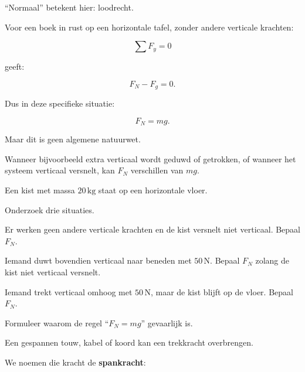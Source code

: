 \documentclass{ximera}
\begin{document}
``Normaal'' betekent hier: loodrecht.



Voor een boek in rust op een horizontale tafel, zonder andere verticale
krachten:

\[
\sum F_y=0
\]

geeft:

\[
F_N-F_g=0.
\]

Dus in deze specifieke situatie:

\[
F_N=mg.
\]

Maar dit is geen algemene natuurwet.

Wanneer bijvoorbeeld extra verticaal wordt geduwd of getrokken, of
wanneer het systeem verticaal versnelt, kan $F_N$ verschillen van
$mg$.


\begin{oefening}[Wanneer is $F_N=mg$?]{\oefU\ESS}

Een kist met massa $20\,\mathrm{kg}$ staat op een horizontale vloer.

Onderzoek drie situaties.

\begin{question}
Er werken geen andere verticale krachten en de kist versnelt niet
verticaal. Bepaal $F_N$.
\end{question}

\begin{question}
Iemand duwt bovendien verticaal naar beneden met $50\,\mathrm N$.
Bepaal $F_N$ zolang de kist niet verticaal versnelt.
\end{question}

\begin{question}
Iemand trekt verticaal omhoog met $50\,\mathrm N$, maar de kist blijft
op de vloer. Bepaal $F_N$.
\end{question}

\begin{question}
Formuleer waarom de regel ``$F_N=mg$'' gevaarlijk is.
\end{question}

\end{oefening}




Een gespannen touw, kabel of koord kan een trekkracht overbrengen.

We noemen die kracht de \textbf{spankracht}:
\end{document}
